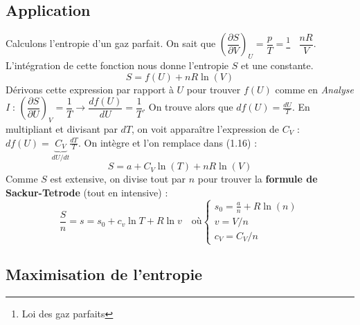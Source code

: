 \documentclass[11pt, a4paper, openany]{book}
\begin{document}
\subsection{Application}
Calculons l'entropie d'un gaz parfait. On sait que $\left(\dfrac{\partial S}{\partial V}\right)_U = \dfrac{p}{T} =$\footnote{Loi des gaz parfaits}$ \ \ \ \ \dfrac{nR}{V}$.\\
L'intégration de cette fonction nous donne l'entropie $S$ et une constante.
\begin{equation}
S = f(U) + nR\ln(V)
\end{equation}
Dérivons cette expression par rapport à $U$ pour trouver $f(U)$ comme en \textit{Analyse I} : $\left(\dfrac{\partial S}{\partial U}\right)_V = \dfrac{1}{T} \rightarrow \dfrac{df(U)}{dU} = \dfrac{1}{T}$.
On trouve alors que $df(U) = \frac{dU}{T}$. En multipliant et divisant par $dT$, on voit apparaître l'expression de $C_V$ : $df(U) = \underbrace{C_V}_{dU/dt}\frac{dT}{T}$. On intègre et l'on remplace dans (1.16) :
\begin{equation}
S = a + C_V\ln(T) + nR\ln(V)
\end{equation}
Comme $S$ est extensive, on divise tout par $n$ pour trouver la \textbf{formule de Sackur-Tetrode} (tout en intensive) :
\begin{equation}
\frac{S}{n} = s = s_0 + c_v\ln T + R\ln v\quad\text{où}\left\{\begin{array}{l}
s_0=\frac{a}{n}+R\ln(n)\\
v=V/n\\
c_V=C_V/n
\end{array}\right.
\end{equation}

\subsection{Maximisation de l'entropie}
\end{document}
